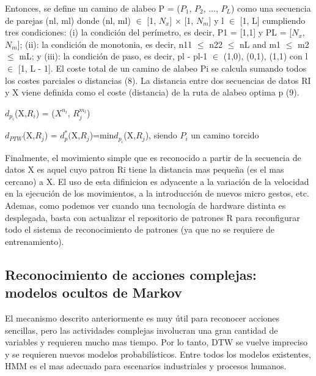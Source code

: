 \documentclass[a4paper]{article}
\begin{document}
Entonces, se define un camino de alabeo P = ($P_1$, $P_2$, ..., $P_L$) como una secuencia de parejas (nl, ml) donde (nl, ml) $\in$ [1, $N_x$] × [1, $N_m$] y l $\in$ [1, L] cumpliendo tres condiciones: (i) la condición del perímetro, es decir, P1 = [1,1] y PL = [$N_x$, $N_m$]; (ii): la condición de monotonia, es decir, n11 $\leq$ n22 $\leq$ nL and m1 $\leq$ m2 $\leq$ mL; y (iii): la condición de paso, es decir, pl - pl-1 $\in$ {(1,0), (0,1), (1,1)} con l $\in$ [1, L - 1]. El coste total de un camino de alabeo Pi se calcula sumando todos los costes parciales o distancias (8). La distancia entre dos secuencias de datos RI y X viene definida como el coste (distancia) de la ruta de alabeo optima p (9). 
\begin{center}
$d_{p_i}$(X,$R_i$) = \sum($X^{n_l}$, $R_j^{m_l}$)
\end{center}
\begin{center}
$d_{PTW}$(X,$R_j$) = $d_p^*($X,$R_j$)=min{$d_{p_i}$(X,$R_j$)}, siendo $P_i$ un camino torcido
\end{center}

Finalmente, el movimiento simple que es reconocido a partir de la secuencia de datos X es aquel cuyo patron Ri tiene la distancia mas pequeña (es el mas cercano) a X. El uso de esta difinicion es adyacente a la variación de la velocidad en la ejecución de los movimientos, a la introducción de nuevos micro gestos, etc. Ademas, como podemos ver cuando una tecnología de hardware distinta es desplegada, basta con actualizar el repositorio de patrones R para reconfigurar todo el sistema de reconocimiento de patrones (ya que no se requiere de entrenamiento). 
\subsection{Reconocimiento de acciones complejas: modelos ocultos de Markov}
El mecanismo descrito anteriormente es muy útil para reconocer acciones sencillas, pero las actividades complejas involucran una gran cantidad de variables y requieren mucho mas tiempo. Por lo tanto, DTW se vuelve impreciso y se requieren nuevos modelos probabilísticos. Entre todos los modelos existentes, HMM es el mas adecuado para escenarios industriales y procesos humanos. 
\end{document}
